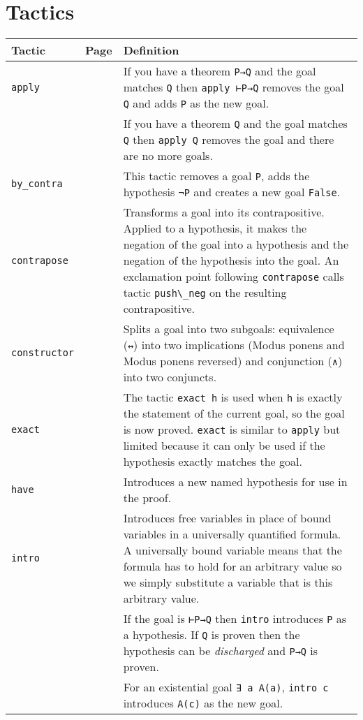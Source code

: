 \newpage


\section{Tactics}

\begin{tabular}{p{}|r|p{}}
\hline
Tactic & Page & Definition\\
\hline
\Verb+apply+&\pageref{p.apply}&If you have a theorem \Verb+P→Q+ and the goal matches \Verb+Q+ then \Verb+apply ⊢P→Q+ removes the goal \Verb+Q+ and adds \Verb+P+ as the new goal.\\
&&If you have a theorem \Verb+Q+ and the goal matches \Verb+Q+ then \Verb+apply Q+ removes the goal and there are no more goals.\\\hline

\Verb+by_contra+&\pageref{p.by-contra}&This tactic removes a goal \Verb+P+, adds the hypothesis \Verb+¬P+ and creates a new goal \Verb+False+.\\\hline

\Verb+contrapose+&\pageref{p.contrapose}&Transforms a goal into its contrapositive. Applied to a hypothesis, it makes the negation of the goal into a hypothesis and the negation of the hypothesis into the goal. 
An exclamation point following \Verb+contrapose+ calls tactic \Verb+push\_neg+ on the resulting contrapositive.\\\hline

\Verb+constructor+&\pageref{p.constructor}&Splits a goal into two subgoals: equivalence (\Verb+↔+) into two implications (Modus ponens and Modus ponens reversed) and conjunction (\Verb+∧+) into two conjuncts.\\\hline

\Verb+exact+&\pageref{p.exact}&The tactic \Verb+exact h+ is used when \Verb+h+ is exactly the statement of the current goal, so the goal is now proved. \Verb+exact+ is similar to \Verb+apply+ but limited because it can only be used if the hypothesis exactly matches the goal.\\\hline

\Verb+have+&\pageref{p.have}&Introduces a new named hypothesis for use in the proof.\\\hline

\Verb+intro+&\pageref{p.intro}&Introduces free variables in place of bound variables in a universally quantified formula. A universally bound variable means that the formula has to hold for an arbitrary value so we simply substitute a variable that is this arbitrary value.\\
&&If the goal is \Verb+⊢P→Q+ then \Verb+intro+ introduces \Verb+P+ as a hypothesis. If \Verb+Q+ is proven then the hypothesis can be \emph{discharged} and \Verb+P→Q+ is proven.\\
&&For an existential goal \Verb+∃ a A(a)+, \Verb+intro c+ introduces \Verb+A(c)+ as the new goal.\\\hline


\end{tabular}

